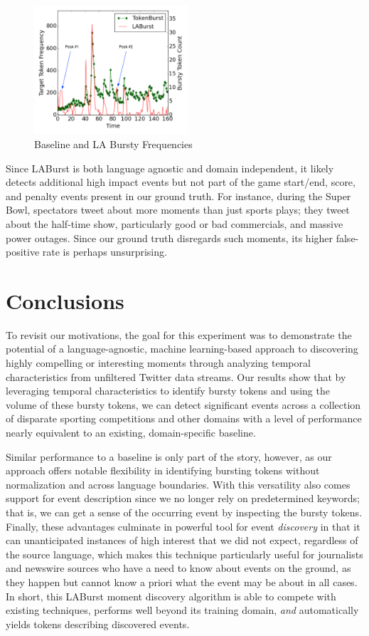 \documentclass[letterpaper]{article}
\begin{document}
\begin{figure}[hbtp]
\begin{center}
\includegraphics[width=2.25in]{./figures/wc0713freq-labeled.png}
\caption{Baseline and LA Bursty Frequencies}
\label{fig:worldCupFreqs}
\end{center}
\end{figure}

Since LABurst is both language agnostic and domain independent, it likely detects additional high impact events but not part of the game start/end, score, and penalty events present in our ground truth.
For instance, during the Super Bowl, spectators tweet about more moments than just sports plays; they tweet about the half-time show, particularly good or bad commercials, and massive power outages.
Since our ground truth disregards such moments, its higher false-positive rate is perhaps unsurprising.

\section{Conclusions}
\label{sect:conlusions}

To revisit our motivations, the goal for this experiment was to demonstrate the potential of a language-agnostic, machine learning-based approach to discovering highly compelling or interesting moments through analyzing temporal characteristics from unfiltered Twitter data streams.
Our results show that by leveraging temporal characteristics to identify bursty tokens and using the volume of these bursty tokens, we can detect significant events across a collection of disparate sporting competitions and other domains with a level of performance nearly equivalent to an existing, domain-specific baseline.

Similar performance to a baseline is only part of the story, however, as our approach offers notable flexibility in identifying bursting tokens without normalization and across language boundaries.
With this versatility also comes support for event description since we no longer rely on predetermined keywords; that is, we can get a sense of the occurring event by inspecting the bursty tokens.
Finally, these advantages culminate in powerful tool for event \emph{discovery} in that it can unanticipated instances of high interest that we did not expect, regardless of the source language, which makes this technique particularly useful for journalists and newswire sources who have a need to know about events on the ground, as they happen but cannot know a priori what the event may be about in all cases.
In short, this LABurst moment discovery algorithm is able to compete with existing techniques, performs well beyond its training domain, \emph{and} automatically yields tokens describing discovered events.
\end{document}
